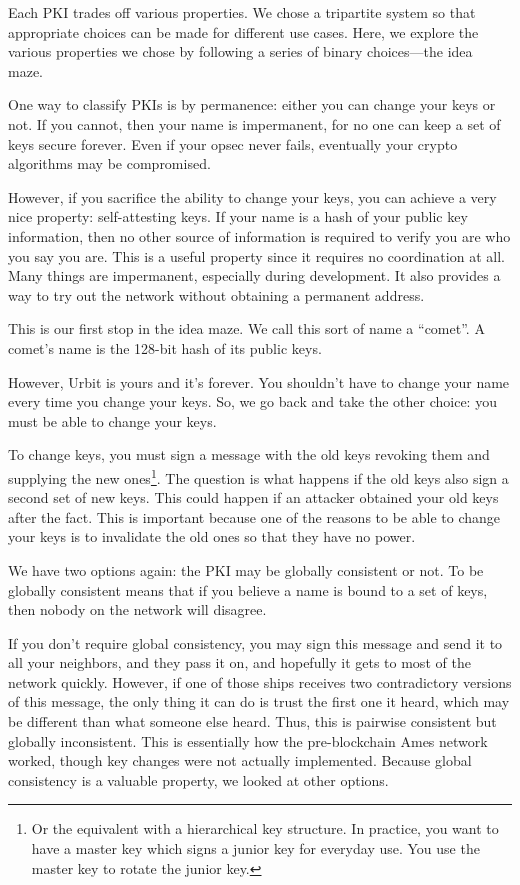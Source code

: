 \documentclass[twoside]{article}
\begin{document}
Each PKI trades off various properties. We chose a tripartite system so
that appropriate choices can be made for different use cases. Here, we
explore the various properties we chose by following a series of binary
choices—the idea maze.

One way to classify PKIs is by permanence: either you can change your keys or not. If
you cannot, then your name is impermanent, for no one can keep a set of
keys secure forever. Even if your opsec never fails, eventually your
crypto algorithms may be compromised.

However, if you sacrifice the ability to change your keys, you can achieve
a very nice property: self-attesting keys. If your name is a hash of
your public key information, then no other source of information is
required to verify you are who you say you are. This is a useful
property since it requires no coordination at all. Many things are
impermanent, especially during development. It also provides a way to
try out the network without obtaining a permanent address.

This is our first stop in the idea maze. We call this sort of name a
``comet''. A comet's name is the 128-bit hash of its public keys.

However, Urbit is yours and it's forever. You shouldn't have to change
your name every time you change your keys. So, we go back and take the
other choice: you must be able to change your keys.

To change keys, you must sign a message with the old keys revoking them
and supplying the new
ones\footnote{Or the equivalent with a hierarchical key structure. In practice, you
want to have a master key which signs a junior key for everyday use.
You use the master key to rotate the junior
key.}. The question is what
happens if the old keys also sign a second set of new keys. This could
happen if an attacker obtained your old keys after the fact. This is
important because one of the reasons to be able to change your keys is
to invalidate the old ones so that they have no power.

We have two options again: the PKI may be globally consistent or not. To
be globally consistent means that if you believe a name is bound to a
set of keys, then nobody on the network will disagree.

If you don't require global consistency, you may sign this message and
send it to all your neighbors, and they pass it on, and hopefully it
gets to most of the network quickly. However, if one of those ships
receives two contradictory versions of this message, the only thing it
can do is trust the first one it heard, which may be different than what
someone else heard. Thus, this is pairwise consistent but globally
inconsistent. This is essentially how the pre-blockchain Ames network
worked, though key changes were not actually implemented. Because global
consistency is a valuable property, we looked at other options.
\end{document}
